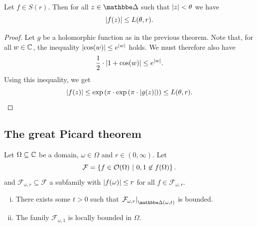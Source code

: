 \begin{izrek}[Schottky]
Let $f \in S(r)$. Then for all $z \in \dsk$ such that
$\left\lvert z\right\rvert < \theta$ we have
\[
\left\lvert f(z)\right\rvert \leq L(\theta, r).
\]
\end{izrek}

\begin{proof}
Let $g$ be a holomorphic function as in the previous theorem. Note
that, for all $w \in \mathbb{C}$, the inequality
$\left\lvert \cos(w)\right\rvert \leq e^{\left\lvert w\right\rvert}$ holds. We must therefore also have
\[
\frac{1}{2} \cdot \left\lvert 1 + \cos(w)\right\rvert \leq e^{\left\lvert w\right\rvert}.
\]
Using this inequality, we get
\[
\left\lvert f(z)\right\rvert \leq
\exp \left(\pi \cdot \exp \left(\pi \cdot \left\lvert g(z)\right\rvert\right)\right) \leq
L(\theta, r). \qedhere
\]
\end{proof}

\newpage

\subsection{The great Picard theorem}


\begin{lema}
Let $\Omega \subseteq \mathbb{C}$ be a domain, $\omega \in \Omega$ and
$r \in (0, \infty)$. Let
\[
\mathcal{F} =
\left\{f \in \mathcal{O}(\Omega)~\middle\vert~0, 1 \not \in f(\Omega)\right\}.
\]
and $\mathcal{F}_{\omega,r} \subseteq \mathcal{F}$ a subfamily with
$\left\lvert f(\omega)\right\rvert \leq r$ for all $f \in \mathcal{F}_{\omega,r}$.

\begin{enumerate}[i)]
\item There exists some $t > 0$ such that
$\eval{\mathcal{F}_{\omega,r}}{\dsk(\omega,t)}{}$ is bounded.
\item The family $\mathcal{F}_{\omega,1}$ is locally bounded in
$\Omega$.
\end{enumerate}
\end{lema}

